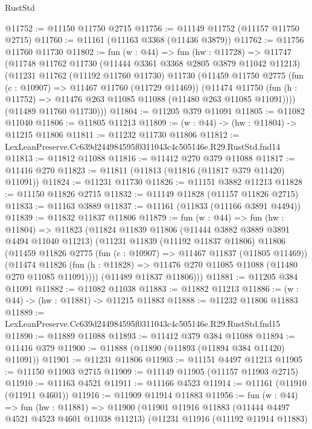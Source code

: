 \begin{lexlean}{RustStd}
\begin{coremodule}
@11752 := @11150 @11750 @2715
@11756 := @11149 @11752 (@11157 @11750 @2715)
@11760 := @11161 (@11163 @3368 (@11436 @3879))
@11762 := @11756 @11760 @11730
@11802 := fun (w : @44) =>
  fun (hw : @11728) =>
  @11747
    (@11748
      @11762
      @11730
      (@11444 @3361 @3368 @2805 @3879 @11042 @11213)
      (@11231
        @11762
        (@11192 @11760 @11730)
        @11730
        (@11459
          @11750
          @2775
          (fun (c : @10907) => @11467 @11760 (@11729 @11469))
          (@11474
            @11750
            (fun (h : @11752) => @11476 @263 @11085 @11088 (@11480 @263 @11085 @11091))))
        (@11489 @11760 @11730)))
@11804 := @11205 @379 @11091
@11805 := @11082 @11040
@11806 := @11805 @11213
@11809 := (w : @44) -> (hw : @11804) -> @11215 @11806
@11811 := @11232 @11730 @11806
@11812 := LexLeanPreserve.Cc639d244984595f0311043c4c505146e.R29.RustStd.fnd14
@11813 := @11812 @11088
@11816 := @11412 @270 @379 @11088
@11817 := @11416 @270
@11823 := @11811 (@11813 (@11816 (@11817 @379 @11420) @11091))
@11824 := @11231 @11730
@11826 := @11151 @3882 @11213
@11828 := @11150 @11826 @2715
@11832 := @11149 @11828 (@11157 @11826 @2715)
@11833 := @11163 @3889
@11837 := @11161 (@11833 (@11166 @3891 @4494))
@11839 := @11832 @11837 @11806
@11879 := fun (w : @44) =>
  fun (hw : @11804) =>
  @11823
    (@11824
      @11839
      @11806
      (@11444 @3882 @3889 @3891 @4494 @11040 @11213)
      (@11231
        @11839
        (@11192 @11837 @11806)
        @11806
        (@11459
          @11826
          @2775
          (fun (c : @10907) => @11467 @11837 (@11805 @11469))
          (@11474
            @11826
            (fun (h : @11828) => @11476 @270 @11085 @11088 (@11480 @270 @11085 @11091))))
        (@11489 @11837 @11806)))
@11881 := @11205 @384 @11091
@11882 := @11082 @11038
@11883 := @11882 @11213
@11886 := (w : @44) -> (hw : @11881) -> @11215 @11883
@11888 := @11232 @11806 @11883
@11889 := LexLeanPreserve.Cc639d244984595f0311043c4c505146e.R29.RustStd.fnd15
@11890 := @11889 @11088
@11893 := @11412 @379 @384 @11088
@11894 := @11416 @379
@11900 := @11888 (@11890 (@11893 (@11894 @384 @11420) @11091))
@11901 := @11231 @11806
@11903 := @11151 @4497 @11213
@11905 := @11150 @11903 @2715
@11909 := @11149 @11905 (@11157 @11903 @2715)
@11910 := @11163 @4521
@11911 := @11166 @4523
@11914 := @11161 (@11910 (@11911 @4601))
@11916 := @11909 @11914 @11883
@11956 := fun (w : @44) =>
  fun (hw : @11881) =>
  @11900
    (@11901
      @11916
      @11883
      (@11444 @4497 @4521 @4523 @4601 @11038 @11213)
      (@11231
        @11916
        (@11192 @11914 @11883)

\end{coremodule}
\end{lexlean}
